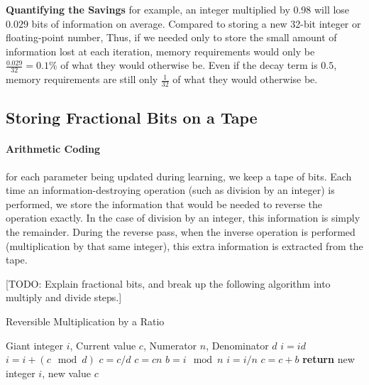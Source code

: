 \documentclass{article}
\begin{document}
\textbf{Quantifying the Savings}
for example, an integer multiplied by 0.98 will lose $0.029$ bits of information on average.
Compared to storing a new 32-bit integer or floating-point number, 
Thus, if we needed only to store the small amount of information lost at each iteration, memory requirements would only be ${\frac{0.029}{32} = 0.1\%}$ of what they would otherwise be.
Even if the decay term is $0.5$, memory requirements are still only $\frac{1}{32}$ of what they would otherwise be.

\subsection{Storing Fractional Bits on a Tape}

\paragraph{Arithmetic Coding} 	\cite{steinruecken2014a}

for each parameter being updated during learning, we keep a tape of bits.
Each time an information-destroying operation (such as division by an integer) is performed, we store the information that would be needed to reverse the operation exactly.  In the case of division by an integer, this information is simply the remainder.
During the reverse pass, when the inverse operation is performed (multiplication by that same integer), this extra information is extracted from the tape.

[TODO: Explain fractional bits, and break up the following algorithm into multiply and divide steps.]

\begin{algorithm}
   \caption{Reversible Multiplication by a Ratio}
   \label{alg:reversible-mult}
\begin{algorithmic}[1]
    Giant integer $i$, Current value $c$, Numerator $n$, Denominator $d$
   \State $i = id$ 
   \State $i = i + (c \mod d)$ 
   \State $c = c / d$ 
   \State $c = cn$ 
   \State $b = i \mod n$ 
   \State $i = i / n$ 
   \State $c = c + b$ 
   \State \textbf{return} new integer $i$, new value $c$
\end{algorithmic}
\end{algorithm}
%
\end{document}
